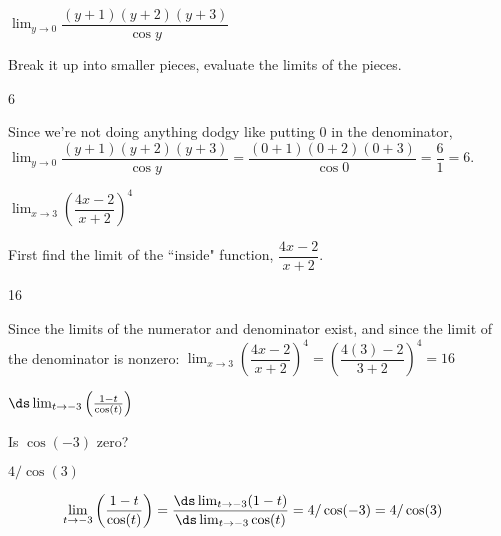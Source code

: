 \begin{question}$\displaystyle\lim_{y \rightarrow 0} \dfrac{(y+1)(y+2)(y+3)}{\cos y}$
\end{question}
\begin{hint} Break it up into smaller pieces, evaluate the limits of the pieces.
\end{hint}
\begin{answer} 6
\end{answer}
\begin{solution} Since we're not doing anything dodgy like putting 0 in the denominator,\\
 $\displaystyle\lim_{y \rightarrow 0} \dfrac{(y+1)(y+2)(y+3)}{\cos y}
=\dfrac{(0+1)(0+2)(0+3)}{\cos 0}=\dfrac{6}{1}=6$.
\end{solution}

\begin{Mquestion}
$\displaystyle\lim_{x \rightarrow 3} \left(\dfrac{4x-2}{x+2}\right)^4$
\end{Mquestion}
\begin{hint} First find the limit of the ``inside" function, $\dfrac{4x-2}{x+2}$.
\end{hint}
\begin{answer} 16
\end{answer}
\begin{solution} Since the limits of the numerator and denominator exist, and since the limit of the denominator is nonzero:
$\displaystyle\lim_{x \rightarrow 3} \left(\dfrac{4x-2}{x+2}\right)^4 =
\left(\dfrac{4(3)-2}{3+2}\right)^4=16
$
\end{solution}



\begin{Mquestion}[2015Q]
 $\ds \lim_{t\to -3} \left(\frac{1-t}{\cos(t)}\right)$
\end{Mquestion}
\begin{hint} 
Is $\cos(-3)$ zero?
\end{hint}
\begin{answer}
$4/\cos(3)$
\end{answer}
\begin{solution}
 \begin{align*}
  \lim_{t\to -3} \left(\frac{1-t}{\cos(t)}\right)
  &= \frac{\ds\lim_{t\to -3} (1-t)}{\ds\lim_{t\to-3}\cos(t)}
  = 4/\cos(-3) = 4/\cos(3)
\end{align*}
\end{solution}

